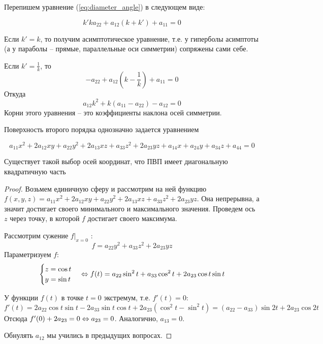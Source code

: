\begin{Rem}
	Перепишем уравнение (\ref{eq:diameter_angle}) в следующем виде:

	\[k'k a_{22} + a_{12}(k + k') + a_{11} = 0\]	

	\begin{MyItemize}
		\item Если $k' = k$, то получим асимптотическое уравнение, т.е. у гиперболы асимптоты (а у параболы -- прямые, параллельные оси симметрии) сопряжены сами себе.
		\item Если $k' = \frac{1}{k}$, то
		\[-a_{22} + a_{12} \left(k - \frac{1}{k}\right)+ a_{11} = 0 \]
		Откуда
		\[a_{12} k^2 + k(a_{11} - a_{22}) - a_{12} = 0\]
		Корни этого уравнения -- это коэффициенты наклона осей симметрии.
	\end{MyItemize}
\end{Rem}


Поверхность второго порядка однозначно задается уравнением

\[a_{11} x^2 + 2a_{12} xy + a_{22} y^2 + 2a_{13} xz + a_{33} z^2 + 2a_{23} yz + a_{14} x + a_{24} y + a_{34} z + a_{44} = 0\]

\begin{Thm}
	Существует такой выбор осей координат, что ПВП имеет диагональную квадратичную часть
\end{Thm}

\begin{proof}
	Возьмем единичную сферу и рассмотрим на ней функцию $f(x, y, z) = a_{11} x^2 + 2a_{12} xy + a_{22} y^2 + 2a_{13} xz + a_{33} z^2 + 2a_{23} yz$.
	Она непрерывна, а значит достигает своего минимального и максимального значения. Проведем ось $z$ через точку, в которой $f$ достигает своего максимума.

	Рассмотрим сужение $f|_{x = 0}$ :
	\[f = a_{22} y^2 + a_{33} z^2 + 2a_{23} yz\]
	Параметризуем $f$:
	\[\begin{cases}
		z = \cos t \\
		y = \sin t
	\end{cases} \Leftrightarrow f(t) = a_{22} \sin^2 t + a_{33} \cos^2 t + 2a_{23} \cos t \sin t\]

	У функции $f(t)$ в точке $t = 0$ экстремум, т.е. $f'(t) = 0$:
	\[f'(t) = 2a_{22} \cos t \sin t - 2a_{33} \sin t \cos t + 2a_{23} (\cos^2 t - \sin^2 t) = (a_{22} - a_{33})\sin 2t + 2a_{23} \cos 2t\]
	Отсюда $f'(0) + 2a_{23} = 0 \Leftrightarrow a_{23} = 0$. Аналогично, $a_{13} = 0$.

	Обнулять $a_{12}$ мы учились в предыдущих вопросах.
\end{proof}


